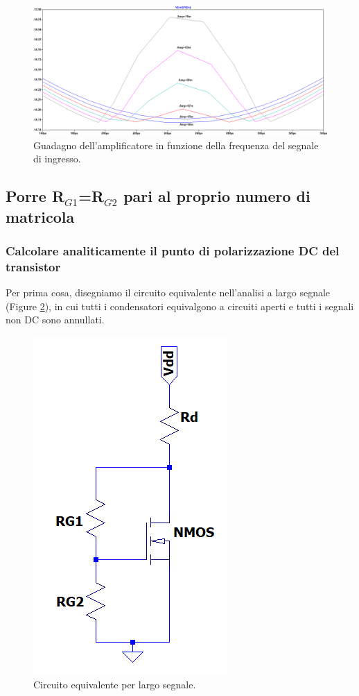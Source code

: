 \documentclass[a4paper,10pt]{article}
\begin{document}
\begin{figure}[h!]
  	\centering
 	\includegraphics[width=0.67\linewidth]{es2-1-7gain.png}
  	\caption{Guadagno dell'amplificatore in funzione della frequenza del segnale di ingresso.}
  	\label{fig:effettodi}
\end{figure}
\newpage


\subsection{Porre R$_{G1}$=R$_{G2}$ pari al proprio numero di matricola}

\subsubsection{Calcolare analiticamente il punto di polarizzazione DC del transistor}
Per prima cosa, disegniamo il circuito equivalente nell'analisi a largo segnale (Figure \ref{fig:pol2}), in cui tutti i condensatori equivalgono a circuiti aperti e tutti i segnali non DC sono annullati.

\begin{figure}[h!]
 	\includegraphics[width=0.16\linewidth]{pol2.png}
 	\centering
 	\caption{Circuito equivalente per largo segnale.}
  	\label{fig:pol2}
\end{figure}
\end{document}

